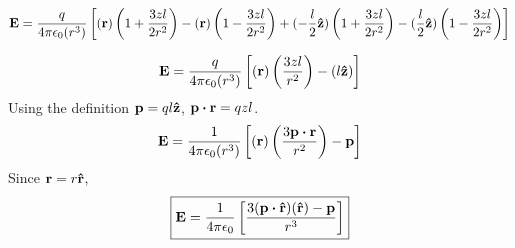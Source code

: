 \documentclass[12pt]{article}
\begin{document}
\[\vb{E}=\frac{q}{4\pi\epsilon_0(r^3)}\left[(\vb{r})\left(1+\frac{3zl}{2r^2}\right)-(\vb{r})\left(1-\frac{3zl}{2r^2}\right)+(-\frac{l}{2}\vu{z})\left(1+\frac{3zl}{2r^2}\right)-(\frac{l}{2}\vu{z})\left(1-\frac{3zl}{2r^2}\right)\right]\]

\[\vb{E}=\frac{q}{4\pi\epsilon_0(r^3)}\left[(\vb{r})\left(\frac{3zl}{r^2}\right)-(l\vu{z})\right]\]
Using the definition $\vb{p}=ql\vu{z}$, $\vb{p}\vdot\vb{r}=qzl$.
\[\vb{E}=\frac{1}{4\pi\epsilon_0(r^3)}\left[(\vb{r})\left(\frac{3\vb{p}\vdot\vb{r}}{r^2}\right)-\vb{p}\right]\]
Since $\vb{r}=r\vu{r}$,
\[\boxed{\vb{E}=\frac{1}{4\pi\epsilon_0}\left[\frac{3(\vb{p}\vdot\vu{r})(\vu{r})-\vb{p}}{r^3}\right]}\]
\end{document}
